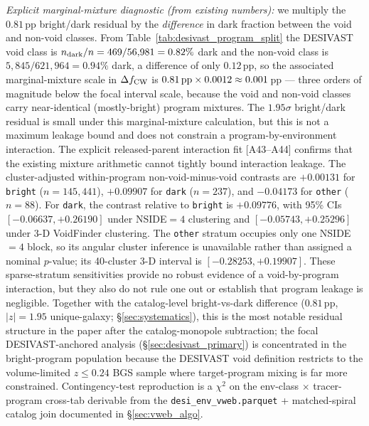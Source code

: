 \documentclass[twocolumn,linenumbers]{aastex702}
\begin{document}
\emph{Explicit marginal-mixture diagnostic (from existing numbers):} we
multiply the $0.81$\,pp bright/dark residual by the \emph{difference} in dark
fraction between the void and non-void classes. From
Table~\ref{tab:desivast_program_split} the DESIVAST void class is
$n_{\rm dark}/n = 469/56{,}981 = 0.82\%$ dark and the non-void class is
$5{,}845/621{,}964 = 0.94\%$ dark, a difference of only $0.12$\,pp, so the
associated marginal-mixture scale in $\Delta f_{\rm CW}$ is
$0.81\,{\rm pp}\times 0.0012 \approx 0.001$\,pp --- three orders of
magnitude below the focal interval scale, because the void and non-void classes
carry near-identical (mostly-bright) program mixtures. The $1.95\sigma$
bright/dark residual is small under this marginal-mixture calculation, but
this is not a maximum leakage bound and does not constrain a
program-by-environment interaction.
The explicit released-parent interaction fit [A43--A44] confirms that the
existing mixture arithmetic cannot tightly bound interaction leakage. The
cluster-adjusted within-program non-void-minus-void contrasts are
$+0.00131$ for \texttt{bright} ($n=145{,}441$), $+0.09907$ for
\texttt{dark} ($n=237$), and $-0.04173$ for \texttt{other} ($n=88$).
For \texttt{dark}, the contrast relative to \texttt{bright} is
$+0.09776$, with 95\% CIs $[-0.06637,+0.26190]$ under NSIDE$=4$
clustering and $[-0.05743,+0.25296]$ under 3-D VoidFinder clustering.
The \texttt{other} stratum occupies only one NSIDE$=4$ block, so its
angular cluster inference is unavailable rather than assigned a nominal
$p$-value; its 40-cluster 3-D interval is
$[-0.28253,+0.19907]$. These sparse-stratum sensitivities provide no
robust evidence of a void-by-program interaction, but they also do not
rule one out or establish that program leakage is negligible.
Together with the catalog-level bright-vs-dark difference
($0.81$\,pp, $|z| = 1.95$ unique-galaxy; \S\ref{sec:systematics}), this is the
most notable residual structure in the paper after
the catalog-monopole subtraction; the focal DESIVAST-anchored
analysis (\S\ref{sec:desivast_primary}) is concentrated in
the bright-program population because the DESIVAST void definition
restricts to the volume-limited $z \leq 0.24$ BGS sample where
target-program mixing is far more constrained. Contingency-test reproduction is a $\chi^{2}$ on the env-class
$\times$ tracer-program cross-tab derivable from the
\texttt{desi\_env\_vweb.parquet} + matched-spiral catalog join
documented in \S\ref{sec:vweb_algo}.
\end{document}
